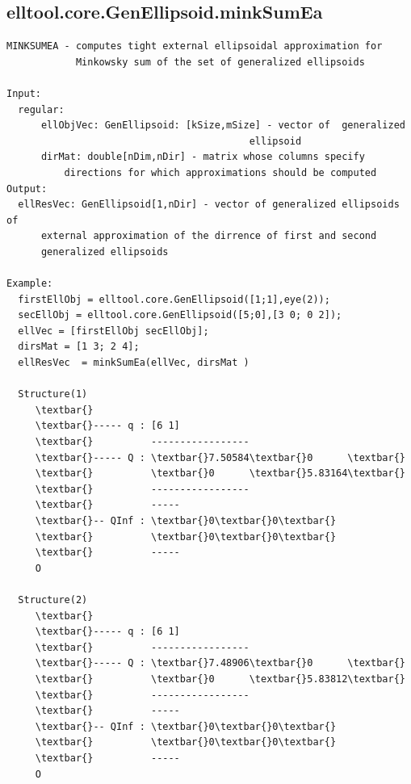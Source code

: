 \documentclass[letterpaper,10pt,english]{sphinxmanual}
\begin{document}
\subsection{elltool.core.GenEllipsoid.minkSumEa}
\label{chap_functions:elltool-core-genellipsoid-minksumea}
\begin{Verbatim}[commandchars=\\\{\}]
MINKSUMEA - computes tight external ellipsoidal approximation for
            Minkowsky sum of the set of generalized ellipsoids

Input:
  regular:
      ellObjVec: GenEllipsoid: [kSize,mSize] - vector of  generalized
                                          ellipsoid
      dirMat: double[nDim,nDir] - matrix whose columns specify
          directions for which approximations should be computed
Output:
  ellResVec: GenEllipsoid[1,nDir] - vector of generalized ellipsoids of
      external approximation of the dirrence of first and second
      generalized ellipsoids

Example:
  firstEllObj = elltool.core.GenEllipsoid([1;1],eye(2));
  secEllObj = elltool.core.GenEllipsoid([5;0],[3 0; 0 2]);
  ellVec = [firstEllObj secEllObj];
  dirsMat = [1 3; 2 4];
  ellResVec  = minkSumEa(ellVec, dirsMat )

  Structure(1)
     \textbar{}
     \textbar{}----- q : [6 1]
     \textbar{}          -----------------
     \textbar{}----- Q : \textbar{}7.50584\textbar{}0      \textbar{}
     \textbar{}          \textbar{}0      \textbar{}5.83164\textbar{}
     \textbar{}          -----------------
     \textbar{}          -----
     \textbar{}-- QInf : \textbar{}0\textbar{}0\textbar{}
     \textbar{}          \textbar{}0\textbar{}0\textbar{}
     \textbar{}          -----
     O

  Structure(2)
     \textbar{}
     \textbar{}----- q : [6 1]
     \textbar{}          -----------------
     \textbar{}----- Q : \textbar{}7.48906\textbar{}0      \textbar{}
     \textbar{}          \textbar{}0      \textbar{}5.83812\textbar{}
     \textbar{}          -----------------
     \textbar{}          -----
     \textbar{}-- QInf : \textbar{}0\textbar{}0\textbar{}
     \textbar{}          \textbar{}0\textbar{}0\textbar{}
     \textbar{}          -----
     O
\end{Verbatim}
\end{document}
